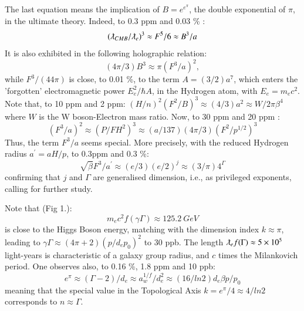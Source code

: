 \documentclass[twoside,draft]{article}
\begin{document}
\begin{sloppypar}
The last equation means the implication of $B = e^{e^{\pi}}$, the double exponential of $\pi$, in the ultimate theory. Indeed, to 0.3 ppm and 0.03 \% :
\begin{equation}
(\lambdabar_{CMB}/\lambdabar_e)^3 \approx F^5/6 \approx B^3/a
\end{equation}
It is also exhibited in the following holographic relation:
\begin{equation}
(4\pi/3) B^3 \approx \pi(F^3/a)^2,
\end{equation}
while $F^3/(44\pi)$ is close, to 0.01 \%, to the term $A = (3/2) a^7$, which enters the 'forgotten' electromagnetic power $E_e^2/\hbar A$, in the Hydrogen atom, with $E_e = m_ec^2$.
Note that, to 10 ppm and 2 ppm:
$
(H/n)^2(F^2/B)^3 \approx (4/3) a^2 \approx W/2\pi \beta^4
$
where $W$ is the W boson-Electron mass ratio. Now, to 30 ppm and 20 ppm :  
\begin{equation}
 (F^3/a)^2 \approx (P/FH^2)^3  \approx  (a/137)(4\pi/3)(F^2/p^{1/2})^3 
\end{equation}
Thus, the term $F^3/a$ seems special. More precisely, with the reduced Hydrogen radius $a^{\prime} = aH/p$, to 0.3ppm and 0.3 \%:
\begin{equation}
\sqrt{\beta} F^3/a^{\prime} \approx (e/3)(e/2)^j  \approx (3/\pi) 4^{\Gamma}
\end{equation}
confirming that $j$ and $\Gamma$ are generalised dimension, i.e., as privileged exponents, calling for further study.

Note that (Fig 1.):
\begin{equation}
m_{e} c^{2} f(\gamma\Gamma) \approx 125.2~ GeV
\end{equation}
is close to the Higgs Boson energy, matching with the dimension index $k \approx \pi$, leading to $\gamma\Gamma \approx (4\pi + 2) (p/d_e p_0)^2 $ to 30 ppb.
The length $\lambdabar_{e} f(\Gamma) \approx 5\times 10^{5}$ light-years is characteristic of a galaxy group radius, and $c$ times the Milankovich period. One observes also, to 0.16 \%, 1.8 ppm and 10 ppb:
$$e^\pi \approx (\Gamma - 2)/d_e \approx a_w^{1/f}/d_e^2 \approx (16/ln2)d_e \beta p/p_0$$
meaning that the special value in the Topological Axis $k = e^{\pi} /4 \approx 4/ln2$ corresponds to $n \approx \Gamma$.


\end{sloppypar}
\end{document}
